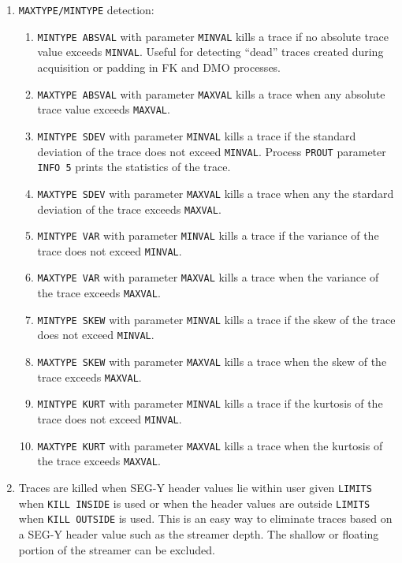 \begin{enumerate}
\item \texttt{MAXTYPE/MINTYPE} detection:
\begin{enumerate}
\item  \texttt{MINTYPE ABSVAL} with parameter \texttt{MINVAL} kills a trace if no absolute
    trace value exceeds \texttt{MINVAL}.  Useful for detecting ``dead'' traces
    created during acquisition or padding in FK and DMO processes.
\item  \texttt{MAXTYPE ABSVAL} with parameter \texttt{MAXVAL} kills a trace when any
    absolute trace value exceeds \texttt{MAXVAL}.
\item  \texttt{MINTYPE SDEV} with parameter \texttt{MINVAL} kills a trace if the standard
    deviation of the trace does not exceed \texttt{MINVAL}.
    Process \texttt{PROUT} parameter \texttt{INFO 5} prints the statistics of the trace.
\item  \texttt{MAXTYPE SDEV} with parameter \texttt{MAXVAL} kills a trace when any the
    stardard deviation of the trace exceeds \texttt{MAXVAL}.
\item  \texttt{MINTYPE VAR} with parameter \texttt{MINVAL} kills a trace if the variance
    of the trace does not exceed \texttt{MINVAL}.
\item  \texttt{MAXTYPE VAR} with parameter \texttt{MAXVAL} kills a trace when the
    variance of the trace exceeds \texttt{MAXVAL}.
\item  \texttt{MINTYPE SKEW} with parameter \texttt{MINVAL} kills a trace if the skew
    of the trace does not exceed \texttt{MINVAL}.
\item  \texttt{MAXTYPE SKEW} with parameter \texttt{MAXVAL} kills a trace when the
    skew of the trace exceeds \texttt{MAXVAL}.
\item  \texttt{MINTYPE KURT} with parameter \texttt{MINVAL} kills a trace if the kurtosis
    of the trace does not exceed \texttt{MINVAL}.
\item  \texttt{MAXTYPE KURT} with parameter \texttt{MAXVAL} kills a trace when the
    kurtosis of the trace exceeds \texttt{MAXVAL}.
\end{enumerate}

\item  Traces are killed when SEG-Y header values lie within user given
    \texttt{LIMITS} when \texttt{KILL INSIDE} is used or when the header values are
    outside \texttt{LIMITS} when \texttt{KILL OUTSIDE} is used.  This is an easy way
    to eliminate traces based on a SEG-Y header value such as the
    streamer depth.  The shallow or floating portion of the streamer
    can be excluded.


\end{enumerate}
